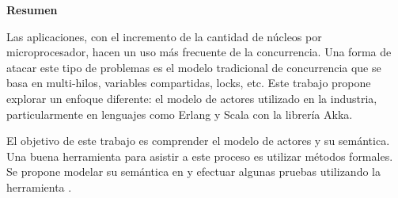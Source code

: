 \begin{center}
\begin{LARGE}\textbf{Resumen}\end{LARGE}
\end{center}

\noindent
Las aplicaciones, con el incremento de la cantidad de núcleos por microprocesador, hacen un uso más frecuente de la concurrencia. Una forma de atacar este tipo de problemas es el modelo tradicional de concurrencia que se basa en multi-hilos, variables compartidas, locks, etc. Este trabajo propone explorar un enfoque diferente: el modelo de actores utilizado en la industria, particularmente en lenguajes como Erlang y Scala con la librería Akka.

\noindent
El objetivo de este trabajo es comprender el modelo de actores y su semántica. Una buena herramienta para asistir a este proceso es utilizar métodos formales. Se propone modelar su semántica en \CSP y efectuar algunas pruebas utilizando la herramienta \FDR.

